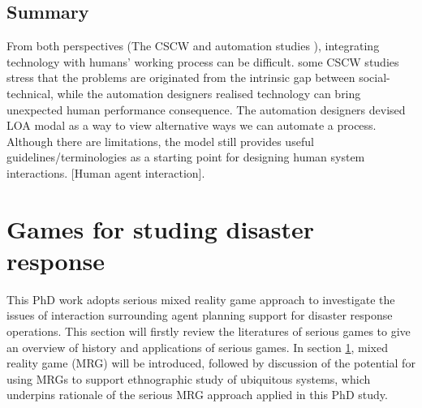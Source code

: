 \subsection{Summary}
From both perspectives (The CSCW and automation studies ), integrating technology with humans' working process can be difficult. some CSCW studies stress that the problems are originated from the intrinsic gap between social-technical, while the automation designers realised technology can bring unexpected human performance consequence. The automation designers devised LOA modal as a way to view alternative ways we can automate a process. Although there are limitations, the model still provides useful guidelines/terminologies as a starting point for designing human system interactions. [Human agent interaction]. \\ 



\section{Games for studing disaster response} \label{sec:LRMRgame}
This PhD work adopts serious mixed reality game approach to investigate the issues of interaction surrounding agent planning support for disaster response operations. This section will firstly review the literatures of serious games to give an overview of history and applications of serious games. In section \ref{sec:LRMRgame}, mixed reality game (MRG) will be introduced, followed by discussion of the potential for using MRGs to support ethnographic study of ubiquitous systems, which underpins rationale of the serious MRG approach applied in this PhD study.\\ 



